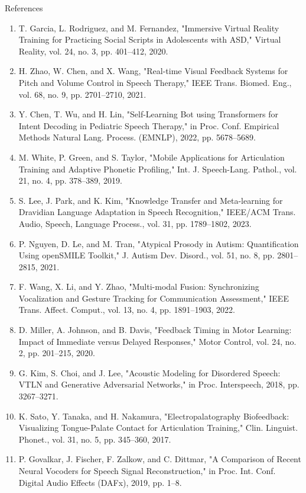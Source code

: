 \documentclass[aspectratio=169, 11pt]{beamer}
\begin{document}
\begin{frame}[allowframebreaks]{References}
\begin{enumerate}
        \item T. Garcia, L. Rodriguez, and M. Fernandez, "Immersive Virtual Reality Training for Practicing Social Scripts in Adolescents with ASD," Virtual Reality, vol. 24, no. 3, pp. 401–412, 2020.
        \item H. Zhao, W. Chen, and X. Wang, "Real-time Visual Feedback Systems for Pitch and Volume Control in Speech Therapy," IEEE Trans. Biomed. Eng., vol. 68, no. 9, pp. 2701–2710, 2021.
        \item Y. Chen, T. Wu, and H. Lin, "Self-Learning Bot using Transformers for Intent Decoding in Pediatric Speech Therapy," in Proc. Conf. Empirical Methods Natural Lang. Process. (EMNLP), 2022, pp. 5678–5689.
        \item M. White, P. Green, and S. Taylor, "Mobile Applications for Articulation Training and Adaptive Phonetic Profiling," Int. J. Speech-Lang. Pathol., vol. 21, no. 4, pp. 378–389, 2019.
        \item S. Lee, J. Park, and K. Kim, "Knowledge Transfer and Meta-learning for Dravidian Language Adaptation in Speech Recognition," IEEE/ACM Trans. Audio, Speech, Language Process., vol. 31, pp. 1789–1802, 2023.
        \item P. Nguyen, D. Le, and M. Tran, "Atypical Prosody in Autism: Quantification Using openSMILE Toolkit," J. Autism Dev. Disord., vol. 51, no. 8, pp. 2801–2815, 2021.
        \item F. Wang, X. Li, and Y. Zhao, "Multi-modal Fusion: Synchronizing Vocalization and Gesture Tracking for Communication Assessment," IEEE Trans. Affect. Comput., vol. 13, no. 4, pp. 1891–1903, 2022.
        \item D. Miller, A. Johnson, and B. Davis, "Feedback Timing in Motor Learning: Impact of Immediate versus Delayed Responses," Motor Control, vol. 24, no. 2, pp. 201–215, 2020.
        \item G. Kim, S. Choi, and J. Lee, "Acoustic Modeling for Disordered Speech: VTLN and Generative Adversarial Networks," in Proc. Interspeech, 2018, pp. 3267–3271.
        \item K. Sato, Y. Tanaka, and H. Nakamura, "Electropalatography Biofeedback: Visualizing Tongue-Palate Contact for Articulation Training," Clin. Linguist. Phonet., vol. 31, no. 5, pp. 345–360, 2017.
        \item P. Govalkar, J. Fischer, F. Zalkow, and C. Dittmar, "A Comparison of Recent Neural Vocoders for Speech Signal Reconstruction," in Proc. Int. Conf. Digital Audio Effects (DAFx), 2019, pp. 1–8.

\end{enumerate}
\end{frame}
\end{document}
